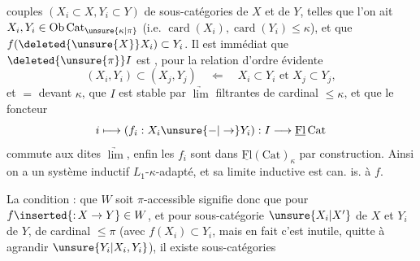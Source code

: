 couples $(X_i\subset X,Y_i\subset Y)$ de sous-catégories de $X$ et de $Y$, telles que l'on ait $X_i,Y_i\in\mathrm{Ob}\,\mathrm{Cat}_{\unsure{\kappa|\pi}}$ (i.e. $\operatorname{card}(X_i),\operatorname{card}(Y_i)\leq\kappa$), et que $f(\deleted{\unsure{X}}X_i)\subset Y_i$.
Il est immédiat que $\deleted{\unsure{\pi}}I$ est , pour la relation d'ordre évidente
\[
(X_i,Y_i)\subset(X_j,Y_j)\quad\Longleftarrow\quad X_i\subset Y_i\text{ et }X_j\subset Y_j,
\]
et $=$  devant $\kappa$, que $I$ est stable par $\underrightarrow{\lim}$ filtrantes de cardinal $\leq\kappa$, et que le foncteur
\[
i\longmapsto(f_i:X_i\unsure{\mathbin{-}|\to}Y_i):I\longrightarrow\underline{\mathrm{Fl}}\,\mathrm{Cat}
\]
commute aux dites $\underrightarrow{\lim}$, enfin les $f_i$ sont dans $\underline{\mathrm{Fl}}(\mathrm{Cat})_\kappa$ par construction.
 Ainsi on a un système inductif $L_1$-$\kappa$-adapté, et  sa limite inductive est can. is. à $f$. 

  La condition : que $W$ soit $\pi$-accessible signifie donc que pour  $f\inserted{{:}\,X\to Y}\in W$,  et pour  sous-catégorie $\unsure{X_i|X'}$ de $X$ et $Y_i$ de $Y$, de cardinal $\leq\pi$ (avec $f(X_i)\subset Y_i$, mais en fait c'est inutile, quitte à agrandir $\unsure{Y_i|X_i,Y_i}$), il existe  sous-catégories

